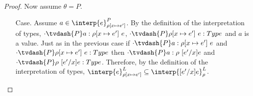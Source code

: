 \begin{proof}
  Now assume $\theta = P$.
  \begin{itemize}
  \item[Case.] Assume $a \in \interp{e}^P_{\rho[x \mapsto e']}$.  By the definition of the 
    interpretation of types, $\cdot \tvdash{P} a:\rho[x \mapsto e']\ e$,
    $\cdot \tvdash{P} \rho[x \mapsto e']\ e:Type$ and $a$ is a value.
    Just as in the previous case if $\cdot \tvdash{P} a:\rho[x \mapsto e']\ e$ and
    $\cdot \tvdash{P} \rho[x \mapsto e']\ e:Type$ then
    $\cdot \tvdash{P} a:\rho\ [e'/x]e$ and $\cdot \tvdash{P} \rho\ [e'/x]e:Type$.  Therefore, by 
    the definition of the interpretation of
    types, $\interp{e}^L_{\rho[x \mapsto e']} \subseteq \interp{[e'/x]e}^L_\rho$.
  \end{itemize}
\end{proof}

